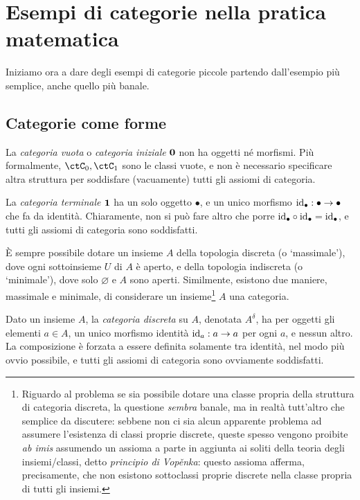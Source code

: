 \section{Esempi di categorie nella pratica matematica}\label{sec_esempi_cats}
Iniziamo ora a dare degli esempi di categorie piccole partendo dall'esempio più semplice, anche quello più banale.
\subsection{Categorie come forme}\label{ssec:categorie_forme}
\begin{example}\label{ex_cat_vuota}
	La \emph{categoria vuota} o \emph{categoria iniziale} \(\mathbf{0}\) non ha oggetti né morfismi. Più formalmente, \(\ctC_0,\ctC_1\) sono le classi vuote, e non è necessario specificare altra struttura per soddisfare (vacuamente) tutti gli assiomi di categoria.
\end{example}
\begin{example}\label{ex_cat_term}
	La \emph{categoria terminale} \(\mathbf{1}\) ha un solo oggetto \(\bullet\), e un unico morfismo \(\mathrm{id}_\bullet : \bullet\to\bullet\) che fa da identità. Chiaramente, non si può fare altro che porre \(\mathrm{id}_\bullet\circ\mathrm{id}_\bullet=\mathrm{id}_\bullet\), e tutti gli assiomi di categoria sono soddisfatti.
\end{example}
\`E sempre possibile dotare un insieme \(A\) della topologia discreta (o `massimale'), dove ogni sottoinsieme \(U\) di \(A\) è aperto, e della topologia indiscreta (o `minimale'), dove solo \(\varnothing\) e \(A\) sono aperti. Similmente, esistono due maniere, massimale e minimale, di considerare un insieme\footnote{Riguardo al problema se sia possibile dotare una classe propria della struttura di categoria discreta, la questione \emph{sembra} banale, ma in realtà tutt'altro che semplice da discutere: sebbene non ci sia alcun apparente problema ad assumere l'esistenza di classi proprie discrete, queste spesso vengono proibite \emph{ab imis} assumendo un assioma a parte in aggiunta ai soliti della teoria degli insiemi/classi, detto \emph{principio di Vop\v enka}: questo assioma afferma, precisamente, che non esistono sottoclassi proprie discrete nella classe propria di tutti gli insiemi.} \(A\) una categoria.
\begin{example}\label{ex_cat_discreta}
	Dato un insieme \(A\), la \emph{categoria discreta} su \(A\), denotata \(A^\delta\), ha per oggetti gli elementi \(a\in A\), un unico morfismo identità \(\mathrm{id}_a : a\to a\) per ogni \(a\), e nessun altro. La composizione è forzata a essere definita solamente tra identità, nel modo più ovvio possibile, e tutti gli assiomi di categoria sono ovviamente soddisfatti.
\end{example}
